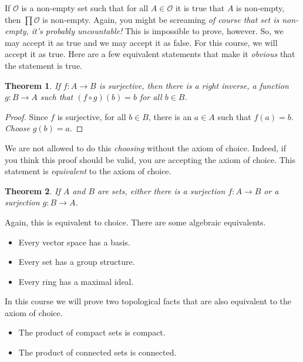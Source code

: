 \documentclass{article}
\theoremstyle{plain}
\newtheorem{theorem}{Theorem}[section]
\theoremstyle{normal}
\newenvironment{axiom}{%
    \pushQED{\qed}\renewcommand{\qedsymbol}{$\blacksquare$}\axiomx%
}{%
    \popQED\endaxiomx%
}
\begin{document}
        \begin{axiom}[\textbf{Axiom of Choice}]
            If $\mathcal{O}$ is a non-empty set such that for all
            $A\in\mathcal{O}$ it is true that $A$ is non-empty, then
            $\prod\mathcal{O}$ is non-empty.
        \end{axiom}
        Again, you might be screaming
        \textit{of course that set is non-empty, it's probably uncountable!}
        This is impossible to prove, however. So, we may accept it as true
        and we may accept it as false. For this course, we will accept it as
        true. Here are a few equivalent statements that make it
        \textit{obvious} that the statement is true.
        \begin{theorem}
            If $f:A\rightarrow{B}$ is surjective, then there is a
            right inverse, a function $g:B\rightarrow{A}$ such that
            $(f\circ{g})(b)=b$ for all $b\in{B}$.
        \end{theorem}
        \begin{proof}
            Since $f$ is surjective, for all $b\in{B}$, there is an
            $a\in{A}$ such that $f(a)=b$. \textit{Choose} $g(b)=a$.
        \end{proof}
        We are not allowed to do this \textit{choosing} without the axiom of
        choice. Indeed, if you think this proof should be valid, you are
        accepting the axiom of choice. This statement is
        \textit{equivalent} to the axiom of choice.
        \begin{theorem}
            If $A$ and $B$ are sets, either there is a surjection
            $f:A\rightarrow{B}$ or a surjection $g:B\rightarrow{A}$.
        \end{theorem}
        Again, this is equivalent to choice. There are some algebraic
        equivalents.
        \begin{itemize}
            \item Every vector space has a basis.
            \item Every set has a group structure.
            \item Every ring has a maximal ideal.
        \end{itemize}
        In this course we will prove two topological facts that are also
        equivalent to the axiom of choice.
        \begin{itemize}
            \item The product of compact sets is compact.
            \item The product of connected sets is connected.
        \end{itemize}
\end{document}
